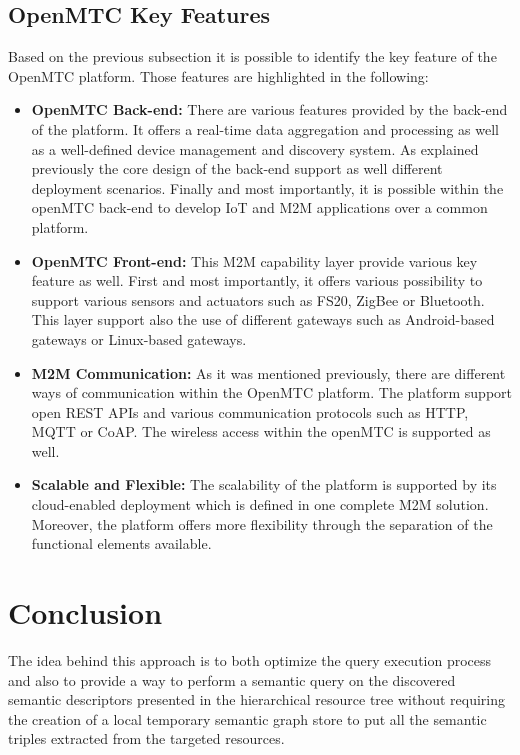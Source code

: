 \subsection{OpenMTC Key Features}
Based on the previous subsection it is possible to identify the key feature of the OpenMTC platform. Those features are highlighted in the following:
\begin{itemize} 
\item \textbf{OpenMTC Back-end:} There are various features provided by the back-end of the platform.  It offers a real-time data aggregation and processing as well as a well-defined device management and discovery system. As explained previously the core design of the back-end support as well different deployment scenarios. Finally and most importantly, it is possible within the openMTC back-end to develop IoT and M2M applications over a common platform. 
\item \textbf{OpenMTC Front-end:} This M2M capability layer provide various key feature as well. First and most importantly, it offers various possibility to support various sensors and actuators such as FS20, ZigBee or Bluetooth. This layer support also the use of different gateways such as Android-based gateways or Linux-based gateways.
\item \textbf{M2M Communication:} As it was mentioned previously, there are different ways of communication within the OpenMTC platform. The platform support open REST APIs and various communication protocols such as HTTP, MQTT or CoAP. The wireless access within the openMTC is supported as well.
\item \textbf{Scalable and Flexible:} The scalability of the platform is supported by its cloud-enabled deployment which is defined in one complete M2M solution. Moreover, the platform offers more flexibility through the separation of the functional elements available.
\end{itemize} 
\section{Conclusion}





The idea behind this approach is to both optimize the query execution process and also to provide a way to perform a semantic query on the discovered semantic descriptors presented in the hierarchical resource tree without requiring the creation of a local temporary semantic graph store to put all the semantic triples extracted from the targeted resources.